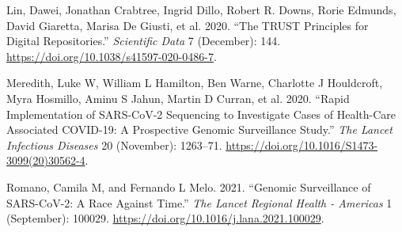 \documentclass{article}
\newlength{\cslhangindent}
\newlength{\cslentryspacingunit} %
\newenvironment{CSLReferences}[2] %
 {%
  \setlength{\parindent}{0pt}
  \ifodd #1
  \let\oldpar\par
  \def\par{\hangindent=\cslhangindent\oldpar}
  \fi
  \setlength{\parskip}{#2\cslentryspacingunit}
 }%
 {}
\begin{document}
\begin{CSLReferences}{1}{0}
\leavevmode\hypertarget{ref-Lin2020}{}%
Lin, Dawei, Jonathan Crabtree, Ingrid Dillo, Robert R. Downs, Rorie
Edmunds, David Giaretta, Marisa De Giusti, et al. 2020. {``The TRUST
Principles for Digital Repositories.''} \emph{Scientific Data} 7
(December): 144. \url{https://doi.org/10.1038/s41597-020-0486-7}.

\leavevmode\hypertarget{ref-Meredith2020}{}%
Meredith, Luke W, William L Hamilton, Ben Warne, Charlotte J Houldcroft,
Myra Hosmillo, Aminu S Jahun, Martin D Curran, et al. 2020. {``Rapid
Implementation of SARS-CoV-2 Sequencing to Investigate Cases of
Health-Care Associated COVID-19: A Prospective Genomic Surveillance
Study.''} \emph{The Lancet Infectious Diseases} 20 (November): 1263--71.
\url{https://doi.org/10.1016/S1473-3099(20)30562-4}.

\leavevmode\hypertarget{ref-Romano2021}{}%
Romano, Camila M, and Fernando L Melo. 2021. {``Genomic Surveillance of
SARS-CoV-2: A Race Against Time.''} \emph{The Lancet Regional Health -
Americas} 1 (September): 100029.
\url{https://doi.org/10.1016/j.lana.2021.100029}.

\end{CSLReferences}



\end{document}
